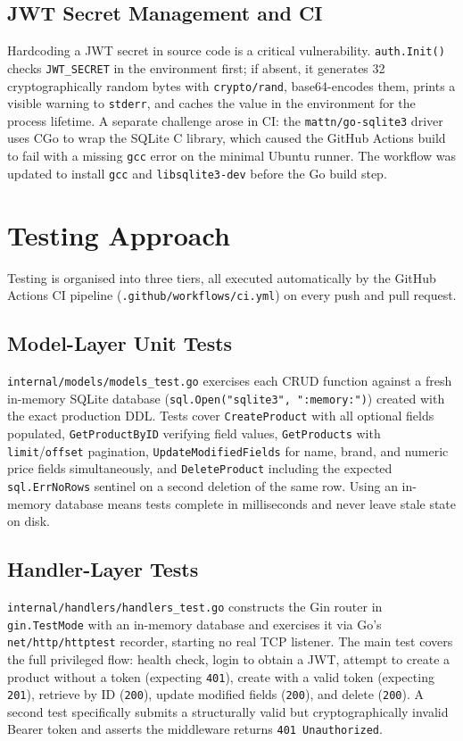 \documentclass[8pt,a4paper]{article}
\begin{document}
\subsection{JWT Secret Management and CI}
Hardcoding a JWT secret in source code is a critical vulnerability. \texttt{auth.Init()} checks \texttt{JWT\_SECRET} in the environment first; if absent, it generates 32 cryptographically random bytes with \texttt{crypto/rand}, base64-encodes them, prints a visible warning to \texttt{stderr}, and caches the value in the environment for the process lifetime. A separate challenge arose in CI: the \texttt{mattn/go-sqlite3} driver uses CGo to wrap the SQLite C library, which caused the GitHub Actions build to fail with a missing \texttt{gcc} error on the minimal Ubuntu runner. The workflow was updated to install \texttt{gcc} and \texttt{libsqlite3-dev} before the Go build step.

\section{Testing Approach}

Testing is organised into three tiers, all executed automatically by the GitHub Actions CI pipeline (\texttt{.github/workflows/ci.yml}) on every push and pull request.

\subsection{Model-Layer Unit Tests}
\texttt{internal/models/models\_test.go} exercises each CRUD function against a fresh in-memory SQLite database (\texttt{sql.Open("sqlite3", ":memory:")}) created with the exact production DDL. Tests cover \texttt{CreateProduct} with all optional fields populated, \texttt{GetProductByID} verifying field values, \texttt{GetProducts} with \texttt{limit}/\texttt{offset} pagination, \texttt{UpdateModifiedFields} for name, brand, and numeric price fields simultaneously, and \texttt{DeleteProduct} including the expected \texttt{sql.ErrNoRows} sentinel on a second deletion of the same row. Using an in-memory database means tests complete in milliseconds and never leave stale state on disk.

\subsection{Handler-Layer Tests}
\texttt{internal/handlers/handlers\_test.go} constructs the Gin router in \texttt{gin.TestMode} with an in-memory database and exercises it via Go's \texttt{net/http/httptest} recorder, starting no real TCP listener. The main test covers the full privileged flow: health check, login to obtain a JWT, attempt to create a product without a token (expecting \texttt{401}), create with a valid token (expecting \texttt{201}), retrieve by ID (\texttt{200}), update modified fields (\texttt{200}), and delete (\texttt{200}). A second test specifically submits a structurally valid but cryptographically invalid Bearer token and asserts the middleware returns \texttt{401 Unauthorized}.
\end{document}
